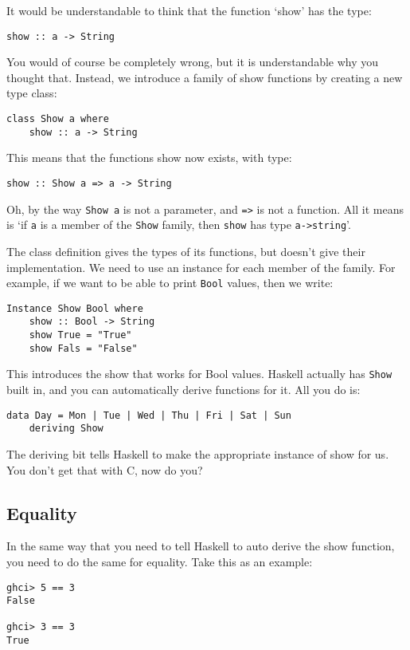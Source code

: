 \documentclass[11pt,a4paper,titlepage,dvipsnames,cmyk]{scrartcl}
\begin{document}
It would be understandable to think that the function `show' has the type:
\begin{lstlisting}[style=B]
show :: a -> String
\end{lstlisting}

You would of course be completely wrong, but it is understandable why you
thought that. Instead, we introduce a family of show functions by creating
a new type class:
\begin{lstlisting}[style=B]
class Show a where
    show :: a -> String
\end{lstlisting}

This means that the functions show now exists, with type:
\begin{lstlisting}[style=B]
show :: Show a => a -> String
\end{lstlisting}

Oh, by the way \lstinline|Show a| is not a parameter, and \lstinline|=>| is not
a function. All it means is `if \lstinline|a| is a member of the
\lstinline|Show| family, then \lstinline|show| has type \lstinline|a->string|'.

The class definition gives the types of its functions, but doesn't give their
implementation. We need to use an instance for each member of the family. For
example, if we want to be able to print \lstinline|Bool| values, then we write:
\begin{lstlisting}[style=B]
Instance Show Bool where
    show :: Bool -> String
    show True = "True"
    show Fals = "False"
\end{lstlisting}

This introduces the show that works for Bool values. Haskell actually has
\lstinline|Show| built in, and you can automatically derive functions for it.
All you do is:

\begin{lstlisting}[style=B]
data Day = Mon | Tue | Wed | Thu | Fri | Sat | Sun
    deriving Show
\end{lstlisting}

The deriving bit tells Haskell to make the appropriate instance of show for us.
You don't get that with C, now do you?

\subsection{Equality}%
\label{sub:Equality}
In the same way that you need to tell Haskell to auto derive the show function,
you need to do the same for equality. Take this as an example:
\begin{lstlisting}[style=B]
ghci> 5 == 3
False

ghci> 3 == 3
True
\end{lstlisting}
\end{document}
